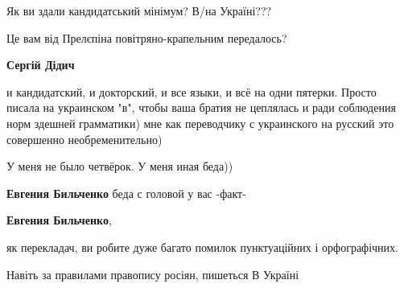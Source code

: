 \begin{itemize}
\begin{itemize}
\end{itemize}

 

Як ви здали кандидатський мінімум? В/на Україні???

Це вам від Прелєпіна повітряно-крапельним передалось?

\begin{itemize}
 
\textbf{Сергій Дідич} 

и кандидатский, и докторский, и все языки, и всё на одни пятерки. Просто писала
на украинском "в", чтобы ваша братия не цеплялась и ради соблюдения норм
здешней грамматики) мне как переводчику с украинского на русский это совершенно
необременительно)


 
У меня не было четвёрок. У меня иная беда))

 
\textbf{Евгения Бильченко} беда с головой у вас -факт-

 
\textbf{Евгения Бильченко}, 

як перекладач, ви робите дуже багато помилок пунктуаційних і орфографічних.

Навіть за правилами правопису росіян, пишеться В Україні


\end{itemize}
\end{itemize}
